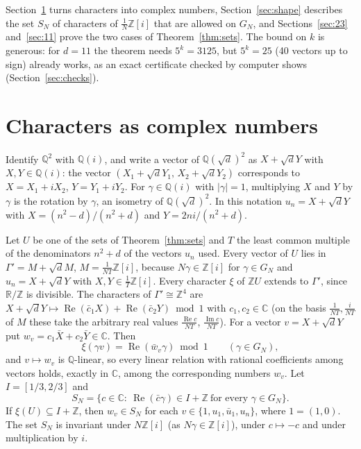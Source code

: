 \documentclass[11pt,a4paper]{amsart}
\theoremstyle{remark}
\newcommand{\Q}{\mathbb{Q}}
\newcommand{\R}{\mathbb{R}}
\newcommand{\Z}{\mathbb{Z}}
\newcommand{\C}{\mathbb{C}}
\begin{document}
Section~\ref{sec:chars} turns characters into complex numbers, Section~\ref{sec:shape} describes the set $S_N$ of
characters of $\frac1N\Z[i]$ that are allowed on $G_N$, and Sections~\ref{sec:23} and~\ref{sec:11} prove the two
cases of Theorem~\ref{thm:sets}. The bound on $k$ is generous: for $d=11$ the theorem needs $5^k=3125$, but $5^k=25$
(40 vectors up to sign) already works, as an exact certificate checked by computer shows (Section~\ref{sec:checks}).

\section{Characters as complex numbers}\label{sec:chars}

Identify $\Q^2$ with $\Q(i)$, and write a vector of $\Q(\sqrt d)^2$ as $X+\sqrt dY$ with $X,Y\in\Q(i)$: the vector
$(X_1+\sqrt dY_1,\,X_2+\sqrt dY_2)$ corresponds to $X=X_1+iX_2$, $Y=Y_1+iY_2$. For $\gamma\in\Q(i)$ with $|\gamma|=1$,
multiplying $X$ and $Y$ by $\gamma$ is the rotation by $\gamma$, an isometry of $\Q(\sqrt d)^2$. In this notation
$u_n=X+\sqrt dY$ with $X=(n^2-d)/(n^2+d)$ and $Y=2ni/(n^2+d)$.

Let $U$ be one of the sets of Theorem~\ref{thm:sets} and $T$ the least common multiple of the denominators $n^2+d$
of the vectors $u_n$ used. Every vector of $U$ lies in $\Gamma'=M+\sqrt dM$, $M=\frac1{NT}\Z[i]$, because
$N\gamma\in\Z[i]$ for $\gamma\in G_N$ and $u_n=X+\sqrt dY$ with $X,Y\in\frac1T\Z[i]$. Every character $\xi$ of $\Z U$
extends to $\Gamma'$, since $\R/\Z$ is divisible. The characters of $\Gamma'\cong\Z^4$ are
$X+\sqrt dY\mapsto\operatorname{Re}(\bar c_1X)+\operatorname{Re}(\bar c_2Y)\bmod 1$ with $c_1,c_2\in\C$ (on the basis
$\frac1{NT},\frac i{NT}$ of $M$ these take the arbitrary real values $\frac{\operatorname{Re}c}{NT}$,
$\frac{\operatorname{Im}c}{NT}$). For a
vector $v=X+\sqrt dY$ put $w_v=c_1\bar X+c_2\bar Y\in\C$. Then
\begin{equation}\label{eq:wv}
\xi(\gamma v)=\operatorname{Re}(\bar w_v\gamma)\bmod1\qquad(\gamma\in G_N),
\end{equation}
and $v\mapsto w_v$ is $\Q$-linear, so every linear relation with rational coefficients among vectors holds,
exactly in $\C$, among the corresponding numbers $w_v$. Let $I=[1/3,2/3]$ and
\[
S_N=\{c\in\C:\ \operatorname{Re}(\bar c\gamma)\in I+\Z\ \text{for every }\gamma\in G_N\}.
\]
If $\xi(U)\subseteq I+\Z$, then $w_v\in S_N$ for each $v\in\{1,u_1,\bar u_1,u_n\}$, where $1=(1,0)$. The set $S_N$
is invariant under $N\Z[i]$ (as $N\gamma\in\Z[i]$), under $c\mapsto-c$ and under multiplication by $i$.
\end{document}
